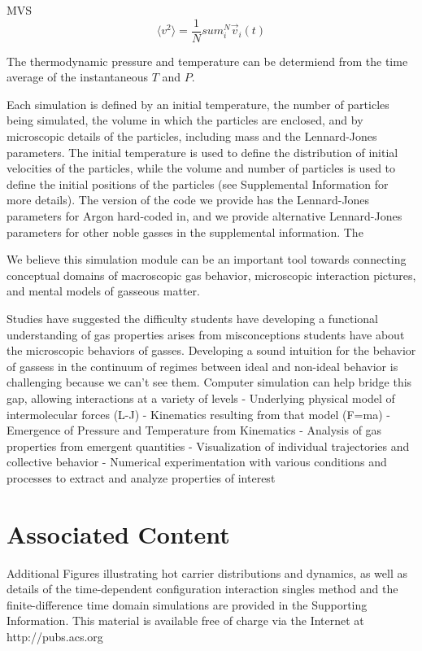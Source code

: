 \documentclass[journal=jpclcd,manuscript=article]{achemso}
\begin{document}
MVS
\begin{equation}
\langle v^2 \rangle = \frac{1}{N} sum_i^N \vec{v}_i(t)
\end{equation}

The thermodynamic pressure and temperature can be determiend from the time average of
the instantaneous $T$ and $P$.  

Each simulation is defined
by an initial temperature, the number of particles being simulated, the volume in which the particles are enclosed,
and by microscopic details of the particles, including mass and the Lennard-Jones parameters.  The initial temperature
is used to define the distribution of initial velocities of the particles, while the volume and number of particles is used
to define the initial positions of the particles (see Supplemental Information for more details).  The version of the code
we provide has the Lennard-Jones parameters for Argon%
hard-coded in, and we provide alternative Lennard-Jones parameters for other noble gasses in the supplemental information.
The

We believe this simulation module can be an important tool towards connecting conceptual domains of macroscopic gas behavior,
microscopic interaction pictures, and mental models of gasseous matter.

Studies have suggested the difficulty students have developing a functional understanding of gas properties
arises from misconceptions students have about the microscopic behaviors of gasses.
Developing a sound intuition for the behavior of gassess in the continuum of regimes between ideal and non-ideal
behavior is challenging because we can't see them.
Computer simulation can help bridge this gap, allowing interactions at a variety of levels
- Underlying physical model of intermolecular forces (L-J)
- Kinematics resulting from that model (F=ma)
- Emergence of Pressure and Temperature from Kinematics
- Analysis of gas properties from emergent quantities
- Visualization of individual trajectories and collective behavior
- Numerical experimentation with various conditions and processes to extract and analyze properties of interest




\section{Associated Content}
Additional Figures illustrating hot carrier distributions and dynamics, as well as details of the time-dependent
configuration interaction singles method and the finite-difference time domain simulations are provided in the Supporting 
Information.  This material is available free of charge via the Internet at http://pubs.acs.org
\end{document}
